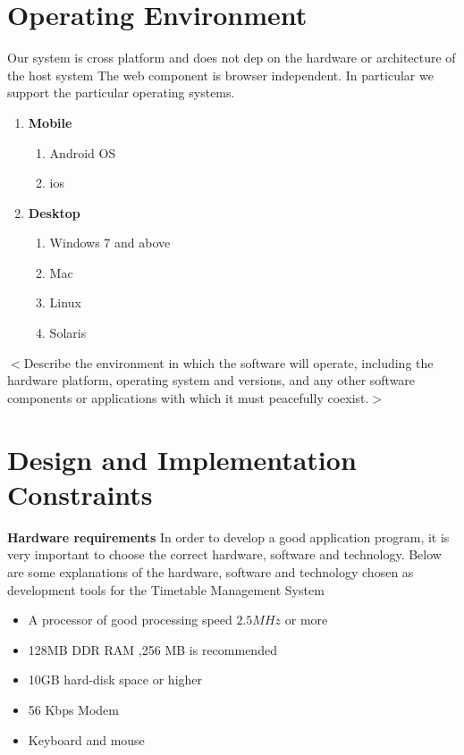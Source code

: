 \documentclass{scrreprt}
\begin{document}

\section{Operating Environment}
  Our system is cross platform and does not dep
 on the hardware or architecture of the host system The web component is browser independent. In particular we support the particular operating systems.
  \begin{enumerate}
  \item \textbf{Mobile}\\
  \begin{enumerate}
  \item Android OS
  \item ios
  \end{enumerate}
  \item \textbf{Desktop}\\
  \begin{enumerate}
     \item Windows 7 and above
     \item Mac
     \item Linux
     \item Solaris
  \end{enumerate}
  \end{enumerate}
 
$<$Describe the environment in which the software will operate, including the 
hardware platform, operating system and versions, and any other software 
components or applications with which it must peacefully coexist.$>$
 
\section{Design and Implementation Constraints}
\textbf {Hardware requirements}
In order to develop a good  application  program, it is very important to choose the correct
hardware, software and technology. Below are some explanations of the hardware,
software and technology chosen as development tools for the Timetable Management
System 
\begin{itemize}
\item A processor of good processing speed $2.5MHz$ or more
\item 128MB DDR RAM ,256 MB is recommended
\item 10GB hard-disk space or higher
\item 56 Kbps Modem
\item Keyboard and mouse
\end {itemize}
\end{document}
